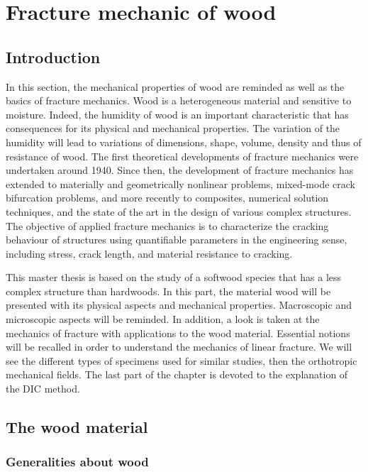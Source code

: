 \chapter{Fracture mechanic of wood}
\label{Chapter1}

\section{Introduction}

In this section, the mechanical properties of wood are reminded as well as the basics of fracture mechanics. 
Wood is a heterogeneous material and sensitive to moisture. Indeed, the humidity of wood is an important characteristic that has consequences for its physical and mechanical properties. The variation of the humidity will lead to variations of dimensions, shape, volume, density and thus of resistance of wood. 
The first theoretical developments of fracture mechanics were undertaken around 1940. Since then, the development of fracture mechanics has extended to materially and geometrically nonlinear problems, mixed-mode crack bifurcation problems, and more recently to composites, numerical solution techniques, and the state of the art in the design of various complex structures. The objective of applied fracture mechanics is to characterize the cracking behaviour of structures using quantifiable parameters in the engineering sense, including stress, crack length, and material resistance to cracking.

This master thesis is based on the study of a softwood species that has a less complex structure than hardwoods. In this part, the material wood will be presented with its physical aspects and mechanical properties. Macroscopic and microscopic aspects will be reminded.
In addition, a look is taken at the mechanics of fracture with applications to the wood material. Essential notions will be recalled in order to understand the mechanics of linear fracture. We will see the different types of specimens used for similar studies, then the orthotropic mechanical fields. The last part of the chapter is devoted to the explanation of the DIC method.

\section{The wood material}

\subsection{Generalities about wood}

